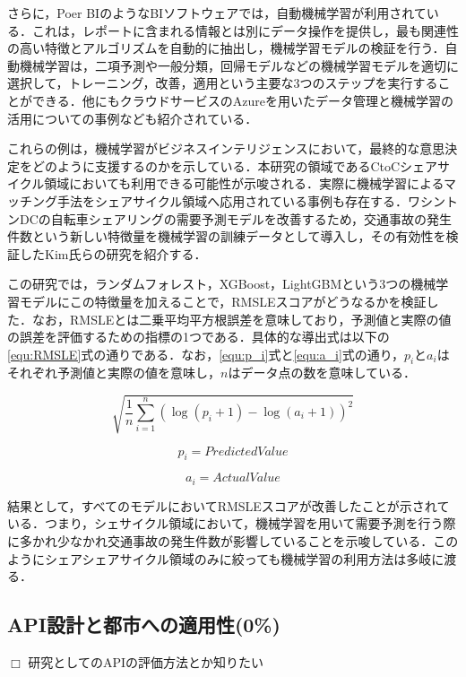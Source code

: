           \par さらに，Poer BIのようなBIソフトウェアでは，自動機械学習が利用されている．これは，レポートに含まれる情報とは別にデータ操作を提供し，最も関連性の高い特徴とアルゴリズムを自動的に抽出し，機械学習モデルの検証を行う．自動機械学習は，二項予測や一般分類，回帰モデルなどの機械学習モデルを適切に選択して，トレーニング，改善，適用という主要な3つのステップを実行することができる．他にもクラウドサービスのAzureを用いたデータ管理と機械学習の活用についての事例なども紹介されている．
          \par これらの例は，機械学習がビジネスインテリジェンスにおいて，最終的な意思決定をどのように支援するのかを示している．本研究の領域であるCtoCシェアサイクル領域においても利用できる可能性が示唆される．実際に機械学習によるマッチング手法をシェアサイクル領域へ応用されている事例も存在する．ワシントンDCの自転車シェアリングの需要予測モデルを改善するため，交通事故の発生件数という新しい特徴量を機械学習の訓練データとして導入し，その有効性を検証したKim氏らの研究を紹介する．
          \par この研究では，ランダムフォレスト，XGBoost，LightGBMという3つの機械学習モデルにこの特徴量を加えることで，RMSLEスコアがどうなるかを検証した．なお，RMSLEとは二乗平均平方根誤差を意味しており，予測値と実際の値の誤差を評価するための指標の1つである．具体的な導出式は以下の\ref{equ:RMSLE}式の通りである．なお，\ref{equ:p_i}式と\ref{equ:a_i}式の通り，$p_i$と$a_i$はそれぞれ予測値と実際の値を意味し，$n$はデータ点の数を意味している．

          \begin{equation}\label{equ:RMSLE}
            \sqrt{\frac{1}{n}\sum_{i=1}^n(\log(p_i + 1) - \log(a_i + 1))^2}
          \end{equation}
          
          \begin{equation}\label{equ:p_i}
            p_i = PredictedValue
          \end{equation}

          \begin{equation}\label{equ:a_i}
            a_i = ActualValue
          \end{equation}

          \par 結果として，すべてのモデルにおいてRMSLEスコアが改善したことが示されている．つまり，シェサイクル領域において，機械学習を用いて需要予測を行う際に多かれ少なかれ交通事故の発生件数が影響していることを示唆している．このようにシェアシェアサイクル領域のみに絞っても機械学習の利用方法は多岐に渡る．

          
  \subsection{API設計と都市への適用性(0\%)}
    \label{sec:API設計と都市への適用性}
      \par $\Box$ 研究としてのAPIの評価方法とか知りたい
      \par 
